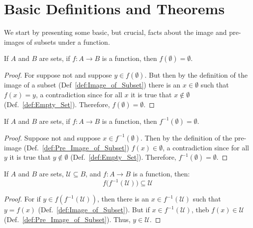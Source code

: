 \section{Basic Definitions and Theorems}
    We start by presenting some basic, but crucial, facts about the image and
    pre-images of subsets under a function.
    \begin{theorem}
        \label{thm:Image_of_Empty_Set_Is_Empty}%
        If $A$ and $B$ are sets, if $f:A\rightarrow{B}$ is a function,
        then $f(\emptyset)=\emptyset$.
    \end{theorem}
    \begin{proof}
        For suppose not and suppose $y\in{f}(\emptyset)$. But then by the
        definition of the image of a subset (Def~\ref{def:Image_of_Subset})
        there is an $x\in\emptyset$ such that $f(x)=y$, a contradiction since
        for all $x$ it is true that $x\notin\emptyset$
        (Def.~\ref{def:Empty_Set}). Therefore, $f(\emptyset)=\emptyset$.
    \end{proof}
    \begin{theorem}
        \label{thm:Pre_Image_of_Empty_Set_Is_Empty}%
        If $A$ and $B$ are sets, if $f:A\rightarrow{B}$ is a function, then
        $f^{\minus{1}}(\emptyset)=\emptyset$.
    \end{theorem}
    \begin{proof}
        Suppose not and suppose $x\in{f}^{\minus{1}}(\emptyset)$. Then by the
        definition of the pre-image (Def.~\ref{def:Pre_Image_of_Subset})
        $f(x)\in\emptyset$, a contradiction since for all $y$ it is true that
        $y\notin\emptyset$ (Def.~\ref{def:Empty_Set}). Therefore,
        $f^{\minus{1}}(\emptyset)=\emptyset$.
    \end{proof}
    \begin{theorem}
        \label{thm:Image_of_PreImage_is_Subset}%
        If $A$ and $B$ are sets, $\mathcal{U}\subseteq{B}$, and
        $f:A\rightarrow{B}$ is a function, then:
        \begin{equation*}
            f\big(f^{\minus{1}}(\mathcal{U})\big)\subseteq\mathcal{U}
        \end{equation*}
    \end{theorem}
    \begin{proof}
        For if $y\in{f(f^{\minus{1}}(\mathcal{U}))}$, then there is an
        $x\in{f^{\minus{1}}(\mathcal{U})}$ such that $y=f(x)$
        (Def.~\ref{def:Image_of_Subset}). But if
        $x\in{f^{\minus{1}}(\mathcal{U})}$, theb $f(x)\in\mathcal{U}$
        (Def.~\ref{def:Pre_Image_of_Subset}). Thus, $y\in\mathcal{U}$.
    \end{proof}
